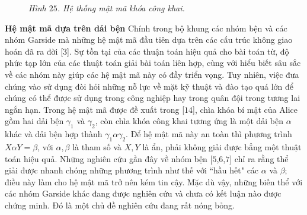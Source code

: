 \begin{multicols}{2}
\begin{figure}[H]
		\caption{\small\textit{\color{duongvaotoanhoc}Hình $25$. Hệ thống mật mã khóa công khai.}}
		\vspace*{-10pt}
	\end{figure}
	\textbf{\color{duongvaotoanhoc}Hệ mật mã dựa trên dải bện}
	\vskip 0.1cm
	Chính trong bộ khung các nhóm bện và các nhóm Garside mà những hệ mật mã đầu tiên dựa trên các cấu trúc không giao hoán đã ra đời [$3$]. Sự tồn tại của các thuận toán hiệu quả cho bài toán từ, độ phức tạp lớn của các thuật toán giải bài toán liên hợp, cùng với hiểu biết sâu sắc về các nhóm này giúp các hệ mật mã này có đầy triển vọng. Tuy nhiên, việc đưa chúng vào sử dụng đòi hỏi những nỗ lực về mặt kỹ thuật và đào tạo quá lớn để chúng có thể được sử dụng trong công nghiệp hay trong quân đội trong tương lai ngắn hạn.
	\vskip 0.1cm
	Trong hệ mật mã được đề xuất trong [$14$], chìa khóa bí mật của Alice gồm hai dải bện $\gamma_1$ và $\gamma_2$, còn chìa khóa công khai tương ứng là một dải bện $\alpha$ khác và dải bện hợp thành $\gamma_1 \alpha \gamma_2$. Để hệ mật mã này an toàn thì phương trình $X \alpha Y = \beta$, với $\alpha, \beta$ là tham số và $X, Y$ là ẩn, phải không giải được bẳng một thuật toán hiệu quả. Những nghiên cứu gần đây về nhóm bện [$5$,$6$,$7$] chỉ ra rằng thể giải được nhanh chóng những phương trình như thế với ``hầu hết" các $\alpha$ và $\beta$; điều này làm cho hệ mật mã trở nên kém tin cậy. Mặc dù vậy, những biến thể với các nhóm Garside khác đang được nghiên cứu và chưa có kết luận nào được chứng minh. Đó là một chủ đề nghiên cứu đang rất nóng bỏng.

\end{multicols}
